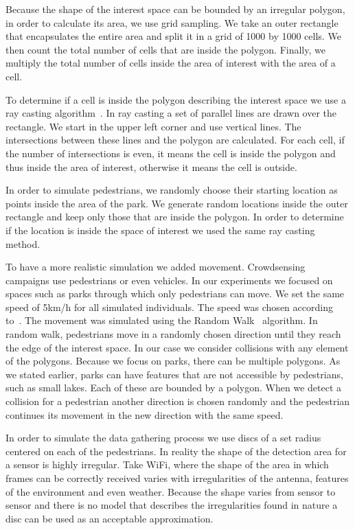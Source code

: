 Because the shape of the interest space can be bounded by an irregular polygon, in order to calculate its area, we use grid sampling. We take an outer rectangle that encapsulates the entire area and split it in a grid of 1000 by 1000 cells. We then count the total number of cells that are inside the polygon. Finally, we multiply the total number of cells inside the area of interest with the area of a cell.

To determine if a cell is inside the polygon describing the interest space we use a ray casting algorithm~\cite{roth1982ray}. In ray casting a set of parallel lines are drawn over the rectangle. We start in the upper left corner and use vertical lines. The intersections between these lines and the polygon are calculated. For each cell, if the number of intersections is even, it means the cell is inside the polygon and thus inside the area of interest, otherwise it means the cell is outside.

In order to simulate pedestrians, we randomly choose their starting location as points inside the area of the park. We generate random locations inside the outer rectangle and keep only those that are inside the polygon. In order to determine if the location is inside the space of interest we used the same ray casting method.

To have a more realistic simulation we added movement. Crowdsensing campaigns use pedestrians or even vehicles. In our experiments we focused on spaces such as parks through which only pedestrians can move. We set the same speed of 5km/h for all simulated individuals. The speed was chosen according to~\cite{carey2005establishing}. The movement was simulated using the Random Walk~\cite{pearson1905problem} algorithm. In random walk, pedestrians move in a randomly chosen direction until they reach the edge of the interest space. In our case we consider collisions with any element of the polygons. Because we focus on parks, there can be multiple polygons. As we stated earlier, parks can have features that are not accessible by pedestrians, such as small lakes. Each of these are bounded by a polygon. When we detect a collision for a pedestrian another direction is chosen randomly and the pedestrian continues its movement in the new direction with the same speed.

In order to simulate the data gathering process we use discs of a set radius centered on each of the pedestrians. In reality the shape of the detection area for a sensor is highly irregular. Take WiFi, where the shape of the area in which frames can be correctly received varies with irregularities of the antenna, features of the environment and even weather. Because the shape varies from sensor to sensor and there is no model that describes the irregularities found in nature a disc can be used as an acceptable approximation.

